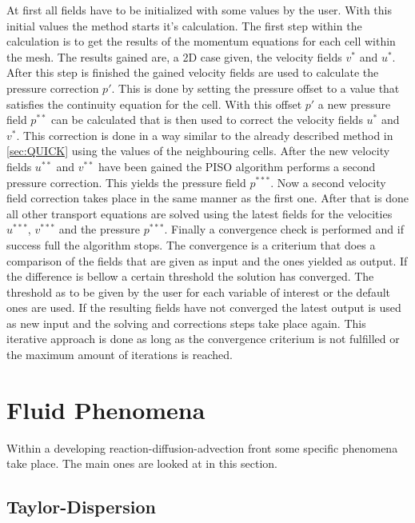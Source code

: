 \documentclass[../thesis.tex]{subfiles}
\begin{document}
At first all fields have to be initialized with some values by the user. With this initial values the method starts it's calculation. The first step within the calculation is to get the results of the momentum equations for each cell within the mesh. The results gained are, a 2D case given, the velocity fields $v^*$ and $u^*$. After this step is finished the gained velocity fields are used to calculate the pressure correction $p'$. This is done by setting the pressure offset to a value that satisfies the continuity equation for the cell. With this offset $p'$ a new pressure field $p^{**}$ can be calculated that is then used to correct the velocity fields $u^*$ and $v^*$. This correction is done in a way similar to the already described method in \autoref{sec:QUICK} using the values of the neighbouring cells. After the new velocity fields $u^{**}$ and $v^{**}$ have been gained the PISO algorithm performs a second pressure correction. This yields the pressure field $p^{***}$. Now a second velocity field correction takes place in the same manner as the first one. After that is done all other transport equations are solved using the latest fields for the velocities $u^{***}$, $v^{***}$ and the pressure $p^{***}$. Finally a convergence check is performed and if success full the algorithm stops. The convergence is a criterium that does a comparison of the fields that are given as input and the ones yielded as output. If the difference is bellow a certain threshold the solution has converged. The threshold as to be given by the user for each variable of interest or the default ones are used. If the resulting fields have not converged the latest output is used as new input and the solving and corrections steps take place again. This iterative approach is done as long as the convergence criterium is not fulfilled or the maximum amount of iterations is reached.


\section{Fluid Phenomena}

Within a developing reaction-diffusion-advection front some specific phenomena take place. The main ones are looked at in this section.

\subsection{Taylor-Dispersion}
\end{document}
